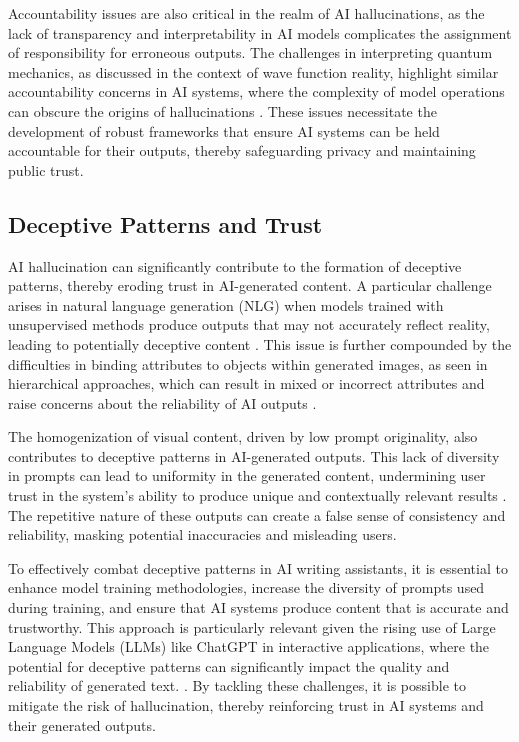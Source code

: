 Accountability issues are also critical in the realm of AI hallucinations, as the lack of transparency and interpretability in AI models complicates the assignment of responsibility for erroneous outputs. The challenges in interpreting quantum mechanics, as discussed in the context of wave function reality, highlight similar accountability concerns in AI systems, where the complexity of model operations can obscure the origins of hallucinations \cite{charrakh2017realitywavefunction}. These issues necessitate the development of robust frameworks that ensure AI systems can be held accountable for their outputs, thereby safeguarding privacy and maintaining public trust.

\subsection{Deceptive Patterns and Trust} \label{subsec:Deceptive Patterns and Trust}

AI hallucination can significantly contribute to the formation of deceptive patterns, thereby eroding trust in AI-generated content. A particular challenge arises in natural language generation (NLG) when models trained with unsupervised methods produce outputs that may not accurately reflect reality, leading to potentially deceptive content \cite{tang2023mvpmultitasksupervisedpretraining}. This issue is further compounded by the difficulties in binding attributes to objects within generated images, as seen in hierarchical approaches, which can result in mixed or incorrect attributes and raise concerns about the reliability of AI outputs \cite{Hierarchic4}.



The homogenization of visual content, driven by low prompt originality, also contributes to deceptive patterns in AI-generated outputs. This lack of diversity in prompts can lead to uniformity in the generated content, undermining user trust in the system's ability to produce unique and contextually relevant results \cite{palmini2024patternscreativityuserinput}. The repetitive nature of these outputs can create a false sense of consistency and reliability, masking potential inaccuracies and misleading users.



To effectively combat deceptive patterns in AI writing assistants, it is essential to enhance model training methodologies, increase the diversity of prompts used during training, and ensure that AI systems produce content that is accurate and trustworthy. This approach is particularly relevant given the rising use of Large Language Models (LLMs) like ChatGPT in interactive applications, where the potential for deceptive patterns can significantly impact the quality and reliability of generated text. \cite{benharrak2024deceptivepatternsintelligentinteractive}. By tackling these challenges, it is possible to mitigate the risk of hallucination, thereby reinforcing trust in AI systems and their generated outputs.



